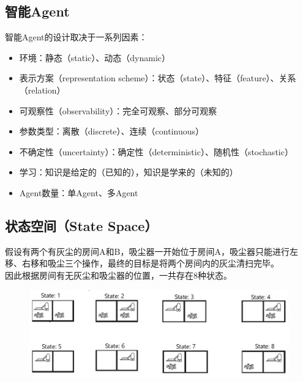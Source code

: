 \subsection{智能Agent}

智能Agent的设计取决于一系列因素：

\begin{itemize}
    \item 环境：静态（static）、动态（dynamic）
    \item 表示方案（representation scheme）：状态（state）、特征（feature）、关系（relation）
    \item 可观察性（observability）：完全可观察、部分可观察
    \item 参数类型：离散（discrete）、连续（continuous）
    \item 不确定性（uncertainty）：确定性（deterministic）、随机性（stochastic）
    \item 学习：知识是给定的（已知的），知识是学来的（未知的）
    \item Agent数量：单Agent、多Agent
\end{itemize}

\vspace{0.5cm}

\subsection{状态空间（State Space）}

假设有两个有灰尘的房间A和B，吸尘器一开始位于房间A，吸尘器只能进行左移、右移和吸尘三个操作，最终的目标是将两个房间内的灰尘清扫完毕。\\

因此根据房间有无灰尘和吸尘器的位置，一共存在8种状态。

\begin{figure}[H]
    \centering
    \includegraphics[scale=0.7]{img/C1/1-2/1.png}
\end{figure}

